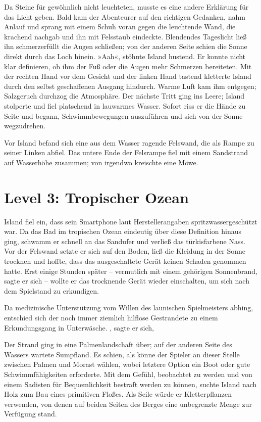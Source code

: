 Da Steine für gewöhnlich nicht leuchteten, musste es eine andere Erklärung für das Licht geben. Bald kam der Abenteurer auf den richtigen Gedanken, nahm Anlauf und sprang mit einem Schuh voran gegen die leuchtende Wand, die krachend nachgab und ihn mit Felsstaub eindeckte. Blendendes Tageslicht ließ ihn schmerzerfüllt die Augen schließen; von der anderen Seite schien die Sonne direkt durch das Loch hinein. »Aah«, stöhnte Island hustend. Er konnte nicht klar definieren, ob ihm der Fuß oder die Augen mehr Schmerzen bereiteten. Mit der rechten Hand vor dem Gesicht und der linken Hand tastend kletterte Island durch den selbst geschaffenen Ausgang hindurch. Warme Luft kam ihm entgegen; Salzgeruch durchzog die Atmosphäre. Der nächste Tritt ging ins Leere; Island stolperte und fiel platschend in lauwarmes Wasser. Sofort riss er die Hände zu Seite und begann, Schwimmbewegungen auszuführen und sich von der Sonne wegzudrehen.

Vor Island befand sich eine aus dem Wasser ragende Felswand, die als Rampe zu seiner Linken abfiel. Das untere Ende der Felsrampe fiel mit einem Sandstrand auf Wasserhöhe zusammen; von irgendwo kreischte eine Möwe.

\section{Level 3: Tropischer Ozean}

Island fiel ein, dass sein Smartphone laut Herstellerangaben spritzwassergeschützt war. Da das Bad im tropischen Ozean eindeutig über diese Definition hinaus ging, schwamm er schnell an das Sandufer und verließ das türkisfarbene Nass. Vor der Felswand setzte er sich auf den Boden, ließ die Kleidung in der Sonne trocknen und hoffte, dass das ausgeschaltete Gerät keinen Schaden genommen hatte. Erst einige Stunden später – vermutlich mit einem gehörigen Sonnenbrand, sagte er sich – wollte er das trocknende Gerät wieder einschalten, um sich nach dem Spielstand zu erkundigen.

Da medizinische Unterstützung vom Willen des launischen Spielmeisters abhing, entschied sich der noch immer ziemlich hilflose Gestrandete zu einem Erkundungsgang in Unterwäsche. , sagte er sich, 

Der Strand ging in eine Palmenlandschaft über; auf der anderen Seite des Wassers wartete Sumpfland. Es schien, als könne der Spieler an dieser Stelle zwischen Palmen und Morast wählen, wobei letztere Option ein Boot oder gute Schwimmfähigkeiten erforderte. Mit dem Gefühl, beobachtet zu werden und von einem Sadisten für Bequemlichkeit bestraft werden zu können, suchte Island nach Holz zum Bau eines primitiven Floßes. Als Seile würde er Kletterpflanzen verwenden, von denen auf beiden Seiten des Berges eine unbegrenzte Menge zur Verfügung stand.

